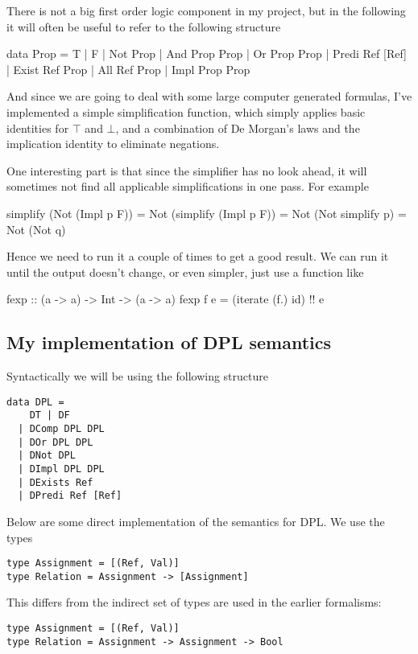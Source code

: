 \documentclass[12pt]{article}
\begin{document}
There is not a big first order logic component in my project, but in the following it will often be useful to refer to the following structure

\begin{haskell}
data Prop =
    T | F
  | Not   Prop
  | And   Prop Prop
  | Or    Prop Prop
  | Predi Ref [Ref]
  | Exist Ref Prop
  | All Ref Prop
  | Impl Prop Prop
\end{haskell}

And since we are going to deal with some large computer generated formulas, I've implemented a simple simplification function, which simply applies basic identities for $\top$ and $\bot$, and a combination of De Morgan's laws and the implication identity to eliminate negations.

One interesting part is that since the simplifier has no look ahead, it will sometimes not find all applicable simplifications in one pass. For example
%
\begin{haskell}
simplify (Not (Impl p F)) = Not (simplify (Impl p F))
                          = Not (Not simplify p)
                          = Not (Not q)
\end{haskell}
%
Hence we need to run it a couple of times to get a good result. We can run it until the output doesn't change, or even simpler, just use a function like
%
\begin{haskell}
fexp :: (a -> a) -> Int -> (a -> a)
fexp f e = (iterate (f.) id) !! e
\end{haskell}

\subsection{My implementation of DPL semantics}

Syntactically we will be using the following structure

\begin{lstlisting}
data DPL =
    DT | DF
  | DComp DPL DPL
  | DOr DPL DPL
  | DNot DPL
  | DImpl DPL DPL
  | DExists Ref
  | DPredi Ref [Ref]
\end{lstlisting}

Below are some direct implementation of the semantics for DPL. We use the types
\begin{lstlisting}
type Assignment = [(Ref, Val)]
type Relation = Assignment -> [Assignment]
\end{lstlisting}
This differs from the indirect set of types are used in the earlier formalisms:
\begin{lstlisting}
type Assignment = [(Ref, Val)]
type Relation = Assignment -> Assignment -> Bool
\end{lstlisting}
\end{document}
